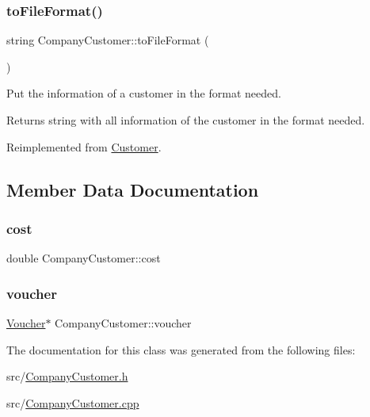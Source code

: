 \subsubsection{\texorpdfstring{to\+File\+Format()}{toFileFormat()}}
{\footnotesize\ttfamily string Company\+Customer\+::to\+File\+Format (\begin{DoxyParamCaption}{ }\end{DoxyParamCaption})\hspace{0.3cm}{\ttfamily [virtual]}}

Put the information of a customer in the format needed. \begin{DoxyReturn}{Returns}
string with all information of the customer in the format needed. 
\end{DoxyReturn}


Reimplemented from \hyperlink{classCustomer_aa609cffee22046082003ea0ac3c191af}{Customer}.



\subsection{Member Data Documentation}
\hypertarget{classCompanyCustomer_a69dd60239a6ccfef6c444e64975fb5d7}{}\label{classCompanyCustomer_a69dd60239a6ccfef6c444e64975fb5d7} 
\subsubsection{\texorpdfstring{cost}{cost}}
{\footnotesize\ttfamily double Company\+Customer\+::cost\hspace{0.3cm}{\ttfamily [private]}}

\hypertarget{classCompanyCustomer_a19915d197c698ef79c608a6ca1f178fe}{}\label{classCompanyCustomer_a19915d197c698ef79c608a6ca1f178fe} 
\subsubsection{\texorpdfstring{voucher}{voucher}}
{\footnotesize\ttfamily \hyperlink{classVoucher}{Voucher}$\ast$ Company\+Customer\+::voucher\hspace{0.3cm}{\ttfamily [private]}}



The documentation for this class was generated from the following files\+:\begin{DoxyCompactItemize}
\item 
src/\hyperlink{CompanyCustomer_8h}{Company\+Customer.\+h}\item 
src/\hyperlink{CompanyCustomer_8cpp}{Company\+Customer.\+cpp}\end{DoxyCompactItemize}
